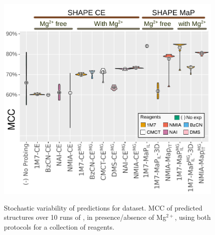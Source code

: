 \documentclass[a4,center,fleqn]{NAR}
\begin{document}
\begin{figure}
	{\centering\includegraphics[width=1\linewidth]{graphs/boxplotreproducibility}\\}
	
	\caption{Stochastic variability of \OurTool{} predictions for \didy{} dataset. MCC of predicted structures over 10 runs of \OurTool{}, in presence/absence of Mg$^{2+}$, using both  protocols for a collection of reagents. }\label{fig:reproducibility}
\end{figure}




%
%
%
%
%	
%	
\end{document}

